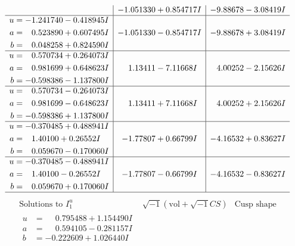 \documentclass[1p]{elsarticle_modified}
\theoremstyle{definition}
\newcommand{\I}{\sqrt{-1}}
\begin{document}
$$\begin{array}{c|c|c}
 & -1.051330 + 0.854717 I & -9.88678 - 3.08419 I \\ \hline\begin{aligned}
u &= -1.241740 - 0.418945 I \\
a &= \phantom{-}0.523890 + 0.607495 I \\
b &= \phantom{-}0.048258 + 0.824590 I\end{aligned}
 & -1.051330 - 0.854717 I & -9.88678 + 3.08419 I \\ \hline\begin{aligned}
u &= \phantom{-}0.570734 + 0.264073 I \\
a &= \phantom{-}0.981699 + 0.648623 I \\
b &= -0.598386 - 1.137800 I\end{aligned}
 & \phantom{-}1.13411 - 7.11668 I & \phantom{-}4.00252 - 2.15626 I \\ \hline\begin{aligned}
u &= \phantom{-}0.570734 - 0.264073 I \\
a &= \phantom{-}0.981699 - 0.648623 I \\
b &= -0.598386 + 1.137800 I\end{aligned}
 & \phantom{-}1.13411 + 7.11668 I & \phantom{-}4.00252 + 2.15626 I \\ \hline\begin{aligned}
u &= -0.370485 + 0.488941 I \\
a &= \phantom{-}1.40100 + 0.26552 I \\
b &= \phantom{-}0.059670 - 0.170060 I\end{aligned}
 & -1.77807 + 0.66799 I & -4.16532 + 0.83627 I \\ \hline\begin{aligned}
u &= -0.370485 - 0.488941 I \\
a &= \phantom{-}1.40100 - 0.26552 I \\
b &= \phantom{-}0.059670 + 0.170060 I\end{aligned}
 & -1.77807 - 0.66799 I & -4.16532 - 0.83627 I\\
 \hline 
 \end{array}$$\newpage$$\begin{array}{c|c|c}  
\text{Solutions to }I^u_{1}& \I (\text{vol} + \sqrt{-1}CS) & \text{Cusp shape}\\
 \hline 
\begin{aligned}
u &= \phantom{-}0.795488 + 1.154490 I \\
a &= \phantom{-}0.594105 - 0.281157 I \\
b &= -0.222609 + 1.026440 I\end{aligned}

\end{array}$$
\end{document}
